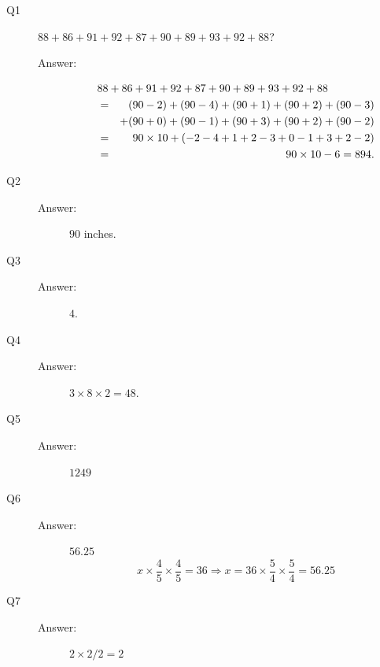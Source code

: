 \documentclass{article}
\begin{document}
\begin{description}

\item[Q1] $88+86+91+92+87+90+89+93+92+88$?

\begin{description}
\item[Answer:] 
\begin{eqnarray*}
\lefteqn{
88+86+91+92+87+90+89+93+92+88}
\\
&=&
(90 - 2)
+ (90 - 4)
+ (90 + 1)
+ (90 + 2)
+ (90 - 3)
\\
&&
+ (90 + 0)
+ (90 - 1)
+ (90 + 3)
+ (90 + 2)
+ (90 - 2)
\\
&=&
90 \times 10
+(- 2 - 4 + 1 + 2 - 3 + 0 - 1 + 3 + 2 - 2)
\\
&=&
90 \times 10 - 6 = 894.
\end{eqnarray*}
\end{description}


\item[Q2]
\begin{description}
\item[Answer:] $90$ inches.
\end{description}


\item[Q3]
\begin{description}
\item[Answer:] $4$.
\end{description}


\item[Q4]
\begin{description}
\item[Answer:] $3 \times 8 \times 2 = 48$.
\end{description}


\item[Q5]
\begin{description}
\item[Answer:] $1249$
\end{description}


\item[Q6]
\begin{description}
\item[Answer:] $56.25$
\begin{equation}
x \times \frac{4}{5} \times \frac{4}{5} = 36
\Rightarrow x = 36 \times \frac{5}{4} \times \frac{5}{4} = 56.25
\end{equation}
\end{description}


\item[Q7]
\begin{description}
\item[Answer:] $2 \times 2 / 2 = 2$
\end{description}



\end{description}
\end{document}
